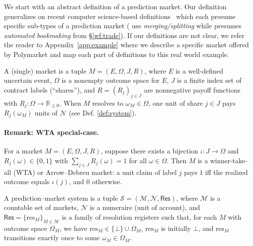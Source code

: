 
We start with an abstract definition of a prediction market. Our definition generalizes on recent computer science-based definitions~\cite{BMR17,FPW23,SGKS25} which each presume specific sub-types of a prediction market (\eg \cite{BMR17,SGKS25} use \textit{merging/splitting} while \cite{FPW23} presumes \textit{automated bookmaking} from \S\ref{wf:trade}). If our definitions are not clear, we refer the reader to Appendix~\ref{app:example} where we describe a specific market offered by Polymarket and map each part of definitions to this real world example.

\begin{definition}[Market]\label{def:market}
A (single) market is a tuple $M=(E,\Omega,J,R)$, where $E$ is a well-defined uncertain event, $\Omega$ is a nonempty outcome space for $E$, $J$ is a finite index set of contract labels (“shares”), and $R=(R_j)_{j\in J}$ are nonnegative payoff functions with $R_j:\Omega\to\mathbb{R}_{\ge 0}$. When $M$ resolves to $\omega_M\in\Omega$, one unit of share $j\in J$ pays $R_j(\omega_M)$ units of $\mathcal{N}$ (see Def. \ref{def:system}).
\end{definition}

\paragraph{Remark: WTA special-case.}
For a market $M=(E,\Omega,J,R)$, suppose there exists a bijection $\iota:J\to\Omega$ and
$R_j(\omega)\in\{0,1\}$ with $\sum_{j\in J} R_j(\omega)=1$ for all $\omega\in\Omega$.
Then $M$ is a winner-take-all (WTA) or Arrow--Debreu market: a unit claim of label $j$ pays $1$ iff the realized outcome equals $\iota(j)$, and $0$ otherwise.

\begin{definition}\label{def:system}
A prediction--market system is a tuple $\mathcal{S}=(\mathcal{M},\mathcal{N},\mathsf{Res})$, where $\mathcal{M}$ is a countable set of markets, $\mathcal{N}$ is a numeraire (unit of account), and $\mathsf{Res}=\{\mathrm{res}_M\}_{M\in\mathcal{M}}$ is a family of resolution registers such that, for each $M$ with outcome space $\Omega_M$, we have $\mathrm{res}_M\in\{\bot\}\cup\Omega_M$, $\mathrm{res}_M$ is initially $\bot$, and $\mathrm{res}_M$ transitions exactly once to some $\omega_M\in\Omega_M$.
\end{definition}


